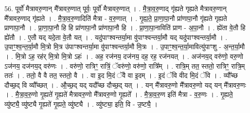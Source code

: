 \documentclass[17pt]{extarticle}
\begin{document}
56. पूर्वो॑ मैत्रावरु॒णान् मै᳚त्रावरु॒णात् पूर्वः॒ पूर्वो॑ मैत्रावरु॒णात् । . मै॒त्रा॒व॒रु॒णाद् गृ॑ह्यते गृह्यते मैत्रावरु॒णान् मै᳚त्रावरु॒णाद् गृ॑ह्यते । . मै॒त्रा॒व॒रु॒णादिति॑ मैत्रा - व॒रु॒णात् । . गृ॒ह्य॒ते॒ प्रा॒णा॒पा॒नौ प्रा॑णापा॒नौ गृ॑ह्यते गृह्यते प्राणापा॒नौ । . प्रा॒णा॒पा॒नौ हि हि प्रा॑णापा॒नौ प्रा॑णापा॒नौ हि । . प्रा॒णा॒पा॒नाविति॑ प्राण - अ॒पा॒नौ । . ह्ये॑ता वे॒तौ हि ह्ये॑तौ । . ए॒तौ यद् यदे॒ता वे॒तौ यत् । . यदु॑पाꣳश्वन्तर्या॒मा वु॑पाꣳश्वन्तर्या॒मौ यद् यदु॑पाꣳश्वन्तर्या॒मौ । . उ॒पाꣳ॒॒श्व॒न्त॒र्या॒मौ मि॒त्रो मि॒त्र उ॑पाꣳश्वन्तर्या॒मा वु॑पाꣳश्वन्तर्या॒मौ मि॒त्रः । . उ॒पाꣳ॒॒श्व॒न्त॒र्या॒मावित्यु॑पाꣳशु - अ॒न्त॒र्या॒मौ । . मि॒त्रो ऽह॒ रह॑र् मि॒त्रो मि॒त्रो ऽहः॑ । . अह॒ रज॑नय॒ दज॑नय॒ दह॒ रह॒ रज॑नयत् । . अज॑नय॒द् वरु॑णो॒ वरु॒णो ऽज॑नय॒ दज॑नय॒द् वरु॑णः । . वरु॑णो॒ रात्रिꣳ॒॒ रात्रिं॒ ॅवरु॑णो॒ वरु॑णो॒ रात्रि᳚म् । . रात्रि॒म् तत॒ स्ततो॒ रात्रिꣳ॒॒ रात्रि॒म् ततः॑ । . ततो॒ वै वै तत॒ स्ततो॒ वै । . वा इ॒द मि॒दं ॅवै वा इ॒दम् । . इ॒दं ॅवि वीद मि॒दं ॅवि । . व्यौ᳚च्छ दौच्छ॒द् वि व्यौ᳚च्छत् । . औ॒च्छ॒द् यद् यदौ᳚च्छ दौच्छ॒द् यत् । . यन् मै᳚त्रावरु॒णो मै᳚त्रावरु॒णो यद् यन् मै᳚त्रावरु॒णः । . मै॒त्रा॒व॒रु॒णो गृ॒ह्यते॑ गृ॒ह्यते॑ मैत्रावरु॒णो मै᳚त्रावरु॒णो गृ॒ह्यते᳚ । . मै॒त्रा॒व॒रु॒ण इति॑ मैत्रा - व॒रु॒णः । . गृ॒ह्यते॒ व्यु॑ष्ट्यै॒ व्यु॑ष्ट्यै गृ॒ह्यते॑ गृ॒ह्यते॒ व्यु॑ष्ट्यै । . व्यु॑ष्ट्या॒ इति॒ वि - उ॒ष्ट्यै॒ । \newline
\end{document}

